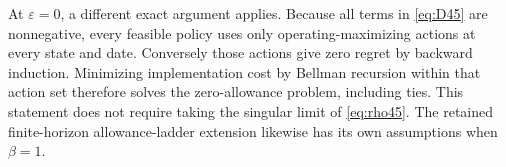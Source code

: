 At $\varepsilon=0$, a different exact argument applies. Because all terms in \eqref{eq:D45} are nonnegative, every feasible policy uses only operating-maximizing actions at every state and date. Conversely those actions give zero regret by backward induction. Minimizing implementation cost by Bellman recursion within that action set therefore solves the zero-allowance problem, including ties. This statement does not require taking the singular limit of \eqref{eq:rho45}. The retained finite-horizon allowance-ladder extension likewise has its own assumptions when $\beta=1$.
